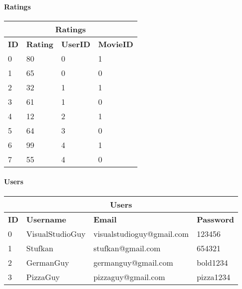 \paragraph{Ratings}

\begin{center}
\begin{tabular}{|l|l|l|l|}
\hline
\multicolumn{4}{|c|}{Ratings} \\ \hline \hline
\textbf{ID} & \textbf{Rating} & \textbf{UserID} & \textbf{MovieID} \\ \hline \hline
0 & 80 & 0 & 1 \\ \hline
1 & 65 & 0 & 0 \\ \hline
2 & 32 & 1 & 1 \\ \hline
3 & 61 & 1 & 0 \\ \hline
4 & 12 & 2 & 1 \\ \hline
5 & 64 & 3 & 0 \\ \hline
6 & 99 & 4 & 1 \\ \hline
7 & 55 & 4 & 0 \\ \hline
\end{tabular}
\end{center}

\paragraph{Users}

\begin{center}
\begin{tabular}{|l|l|l|l|}
\hline
\multicolumn{4}{|c|}{Users} \\ \hline \hline
\textbf{ID} & \textbf{Username} & \textbf{Email} & \textbf{Password} \\ \hline \hline
0 & VisualStudioGuy & visualstudioguy@gmail.com & 123456 \\ \hline
1 & Stufkan & stufkan@gmail.com & 654321 \\ \hline
2 & GermanGuy & germanguy@gmail.com & bold1234 \\ \hline
3 & PizzaGuy & pizzaguy@gmail.com & pizza1234 \\ \hline
\end{tabular}
\end{center}

